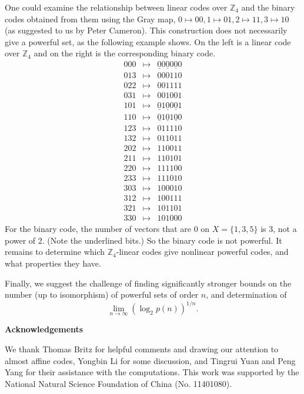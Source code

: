 \documentclass[12pt]{article}
\begin{document}
One could examine the relationship between linear codes over $\mathbb{Z}_4$ and the
binary codes obtained from them using the Gray map,
$0 \mapsto 00,  1 \mapsto 01,  2 \mapsto 11,  3 \mapsto 10$ (as suggested to us by
Peter Cameron).
This construction does not necessarily give a powerful set, as the following example shows.
On the left is a linear code over $\mathbb{Z}_4$ and on the right is the corresponding
binary code.
\[
\begin{array}{ccc}
000 & \mapsto & \underline{0}0\underline{0}0\underline{0}0   \\
013 & \mapsto & 000110   \\
022 & \mapsto & 001111   \\
031 & \mapsto & 001001   \\
101 & \mapsto & \underline{0}1\underline{0}0\underline{0}1   \\
110 & \mapsto & \underline{0}1\underline{0}1\underline{0}0   \\
123 & \mapsto & 011110   \\
132 & \mapsto & 011011   \\
202 & \mapsto & 110011   \\
211 & \mapsto & 110101   \\
220 & \mapsto & 111100   \\
233 & \mapsto & 111010   \\
303 & \mapsto & 100010   \\
312 & \mapsto & 100111   \\
321 & \mapsto & 101101   \\
330 & \mapsto & 101000
\end{array}
\]
For the binary code, the number of vectors that are 0 on $X=\{1,3,5\}$ is 3, not a power of 2.
(Note the underlined bits.)  So the binary code is not powerful.
It remains to determine which $\mathbb{Z}_4$-linear codes give nonlinear powerful codes,
and what properties they have.

Finally, we suggest the challenge of finding significantly stronger bounds on the number
(up to isomorphism) of powerful sets of order $n$, and determination of
\[\lim_{n\rightarrow\infty}(\log_2 p(n))^{1/n}.\]

\vspace{0.5cm}

\newpage
\noindent\textbf{Acknowledgements}

We thank Thomas Britz for helpful comments and drawing our attention to almost affine codes, Yongbin Li for some discussion, and Tingrui Yuan and Peng Yang for their assistance with the computations.  This work was
supported by the National Natural Science Foundation of China (No. 11401080).
\end{document}
